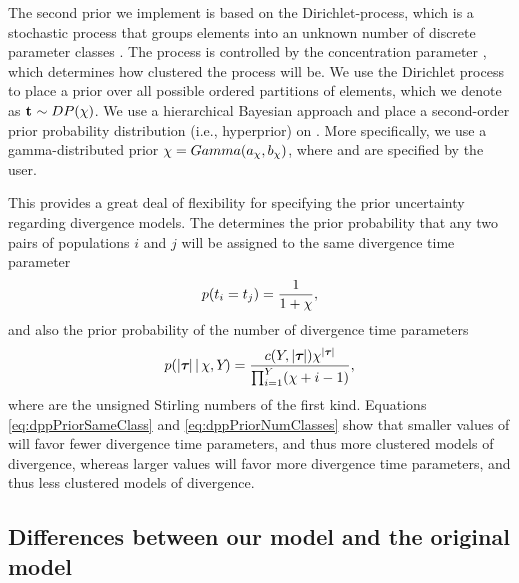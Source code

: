 \documentclass[letterpaper,12pt]{article}
\begin{document}
\begin{linenumbers}
The second prior we implement is based on the Dirichlet-process, which is a
stochastic process that groups elements into an unknown number of discrete
parameter classes \citep{Ferguson1973,Antoniak1974}.
The process is controlled by the concentration parameter \concentrationParam,
which determines how clustered the process will be.
We use the Dirichlet process to place a prior over all possible ordered
partitions of \npairs{} elements, which we denote as $\mathbf{t_{}} \sim
DP(\chi)$.
We use a hierarchical Bayesian approach and place a second-order prior
probability distribution (i.e., hyperprior) on \concentrationParam.  More
specifically, we use a gamma-distributed prior $\chi =
Gamma(a_{\chi}, b_{\chi})$,
where \gammaShape{\concentrationParam} and \gammaScale{\concentrationParam} are
specified by the user.

\begin{linenomath}
This provides a great deal of flexibility for specifying the prior uncertainty
regarding divergence models.
The \concentrationParam determines the prior probability that any two
pairs of populations $i$ and $j$ will be assigned to the same divergence time
parameter
\begin{equation}
    p(t_{i} = t_{j}) = \frac{1}{1 + \chi},
    \label{eq:dppPriorSameClass}
\end{equation}
and also the prior probability of the number of divergence time parameters
\begin{equation}
    p(\lvert \boldsymbol{\tau_{}} \rvert \,|\, \chi, Y_{}) = 
    \frac{c(Y_{}, \lvert \boldsymbol{\tau_{}} \rvert) \chi^{\lvert \boldsymbol{\tau_{}} \rvert}}
    {\prod_{i=1}^{Y_{}}(\chi + i - 1)},
    \label{eq:dppPriorNumClasses}
\end{equation}
where \stirlingFirst{\cdot}{\cdot} are the unsigned Stirling numbers of the
first kind.
Equations \ref{eq:dppPriorSameClass} and \ref{eq:dppPriorNumClasses} show that
smaller values of \concentrationParam will favor fewer divergence time
parameters, and thus more clustered models of divergence, whereas larger values
will favor more divergence time parameters, and thus less clustered models of
divergence.
\end{linenomath}

\subsection*{Differences between our model and the original \msb model}

\end{linenumbers}
\end{document}
